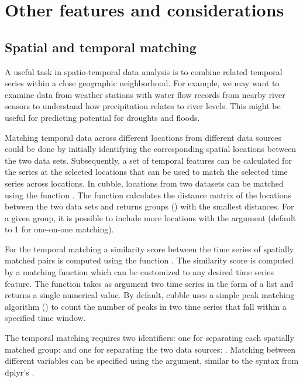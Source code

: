 \documentclass[
  shortnames]{jss}
\begin{document}
\hypertarget{others}{%
\section{Other features and considerations}\label{others}}

\hypertarget{matching}{%
\subsection{Spatial and temporal matching}\label{matching}}

A useful task in spatio-temporal data analysis is to combine related temporal series within a close geographic neighborhood. For example, we may want to examine data from weather stations with water flow records from nearby river sensors to understand how precipitation relates to river levels. This might be useful for predicting potential for droughts and floods.

Matching temporal data across different locations from different data sources could be done by initially identifying the corresponding spatial locations between the two data sets. Subsequently, a set of temporal features can be calculated for the series at the selected locations that can be used to match the selected time series across locations. In cubble, locations from two datasets can be matched using the function . The function calculates the distance matrix of the locations between the two data sets and returns groups () with the smallest distances. For a given group, it is possible to include more locations with the argument  (default to 1 for one-on-one matching).

For the temporal matching a similarity score between the time series of spatially matched pairs is computed using the function . The similarity score is computed by a matching function which can be customized to any desired time series feature. The function  takes as argument two time series in the form of a list and returns a single numerical value. By default, cubble uses a simple peak matching algorithm () to count the number of peaks in two time series that fall within a specified time window.

The temporal matching requires two identifiers: one for separating each spatially matched group:  and one for separating the two data sources: . Matching between different variables can be specified using the  argument, similar to the  syntax from dplyr's .
\end{document}
